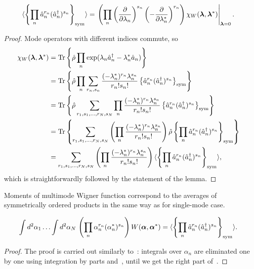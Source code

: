 \begin{lemma}
\label{lmm:formalism:mm-wigner:moments-from-chi}
\[
	\langle \left\{  \prod_n \hat{a}_n^{r_n} (\hat{a}_n^\dagger)^{s_n}  \right\}_{\mathrm{sym}} \rangle
	= \left.
		\left(
			\prod_n
			\left( \frac{\partial}{\partial \lambda_n} \right)^{s_n}
			\left( -\frac{\partial}{\partial \lambda_n^*} \right)^{r_n}
		\right)
		\chi_W (\bm{\lambda}, \bm{\lambda}^*)
	\right|_{\bm{\lambda}=0}.
\]
\end{lemma}
\begin{proof}
Mode operators with different indices commute, so
\begin{equation*}
\begin{split}
	\chi_W (\bm{\lambda}, \bm{\lambda}^*)
	& = \mathrm{Tr} \left\{ 
		\hat{\rho}
		\prod_n
			\exp( \lambda_n \hat{a}_n^\dagger - \lambda_n^* \hat{a}_n)
	 \right\} \\
	& = \mathrm{Tr} \left\{ 
		\hat{\rho}
		\prod_n \sum_{r_n, s_n}
			\frac{(-\lambda_n^*)^{r_n} \lambda_n^{s_n}}{r_n! s_n!}
			\left\{  \hat{a}_n^{r_n} (\hat{a}_n^\dagger)^{s_n} \right\}_{\mathrm{sym}}
	 \right\} \\
	& = \mathrm{Tr} \left\{ 
		\hat{\rho}
		\sum_{r_1, s_1, \ldots, r_N, s_N} \prod_n
			\frac{(-\lambda_n^*)^{r_n} \lambda_n^{s_n}}{r_n! s_n!}
			\left\{  \hat{a}_n^{r_n} (\hat{a}_n^\dagger)^{s_n} \right\}_{\mathrm{sym}}
	 \right\} \\
	& = \mathrm{Tr} \left\{ 
		\sum_{r_1, s_1, \ldots, r_N, s_N}
			\left(
				\prod_n \frac{(-\lambda_n^*)^{r_n} \lambda_n^{s_n}}{r_n! s_n!}
			\right)
			\hat{\rho}
			\left\{  \prod_n \hat{a}_n^{r_n} (\hat{a}_n^\dagger)^{s_n} \right\}_{\mathrm{sym}}
	 \right\} \\
	& = \sum_{r_1, s_1, \ldots, r_N, s_N}
		\left(
			\prod_n \frac{(-\lambda_n^*)^{r_n} \lambda_n^{s_n}}{r_n! s_n!}
		\right)
		\langle
			\left\{  \prod_n \hat{a}_n^{r_n} (\hat{a}_n^\dagger)^{s_n} \right\}_{\mathrm{sym}}
		\rangle,
\end{split}
\end{equation*}
which is straightforwardly followed by the statement of the lemma.
\end{proof}

Moments of multimode Wigner function correspond to the averages of symmetrically ordered products in the same way as for single-mode case.

\begin{theorem}
\[
	\int d^2\alpha_1 \ldots \int d^2\alpha_N\,
		\left(
			\prod_n \alpha_n^{r_n} (\alpha_n^*)^{s_n}
		\right) W(\bm{\alpha}, \bm{\alpha}^*)
	= \langle \left\{  \prod_n \hat{a}_n^{r_n} (\hat{a}_n^\dagger)^{s_n}  \right\}_{\mathrm{sym}} \rangle.
\]
\end{theorem}
\begin{proof}
The proof is carried out similarly to~:
integrals over $\alpha_n$ are eliminated one by one using integration by parts and~,
until we get the right part of~.
\end{proof}

